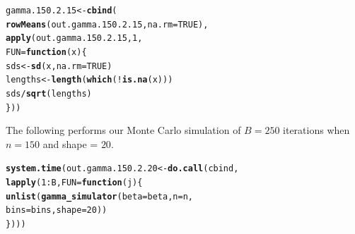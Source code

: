 \documentclass[11pt]{article}\usepackage[]{graphicx}\usepackage[]{color}
\makeatletter
\newcommand{\hlnum}[1]{\textcolor[rgb]{0.686,0.059,0.569}{#1}}%
\newcommand{\hlopt}[1]{\textcolor[rgb]{0,0,0}{#1}}%
\newcommand{\hlstd}[1]{\textcolor[rgb]{0.345,0.345,0.345}{#1}}%
\newcommand{\hlkwa}[1]{\textcolor[rgb]{0.161,0.373,0.58}{\textbf{#1}}}%
\newcommand{\hlkwb}[1]{\textcolor[rgb]{0.69,0.353,0.396}{#1}}%
\newcommand{\hlkwc}[1]{\textcolor[rgb]{0.333,0.667,0.333}{#1}}%
\newcommand{\hlkwd}[1]{\textcolor[rgb]{0.737,0.353,0.396}{\textbf{#1}}}%
\newenvironment{kframe}{%
 \def\at@end@of@kframe{}%
 \ifinner\ifhmode%
  \def\at@end@of@kframe{\end{minipage}}%
  \begin{minipage}{\columnwidth}%
 \fi\fi%
 \def\FrameCommand##1{\hskip\@totalleftmargin \hskip-\fboxsep
 \colorbox{shadecolor}{##1}\hskip-\fboxsep
     \hskip-\linewidth \hskip-\@totalleftmargin \hskip\columnwidth}%
 \MakeFramed {\advance\hsize-\width
   \@totalleftmargin\z@ \linewidth\hsize
   \@setminipage}}%
 {\par\unskip\endMakeFramed%
 \at@end@of@kframe}
\newenvironment{knitrout}{}{} %
\makeatother
\begin{document}
\begin{knitrout}
\color{fgcolor}\begin{kframe}
\begin{alltt}
\hlstd{gamma.150.2.15} \hlkwb{<-} \hlkwd{cbind}\hlstd{(}
  \hlkwd{rowMeans}\hlstd{(out.gamma.150.2.15,} \hlkwc{na.rm} \hlstd{=} \hlnum{TRUE}\hlstd{),}
  \hlkwd{apply}\hlstd{(out.gamma.150.2.15,} \hlnum{1}\hlstd{,}
  \hlkwc{FUN} \hlstd{=} \hlkwa{function}\hlstd{(}\hlkwc{x}\hlstd{)\{}
    \hlstd{sds} \hlkwb{<-} \hlkwd{sd}\hlstd{(x,} \hlkwc{na.rm} \hlstd{=} \hlnum{TRUE}\hlstd{)}
    \hlstd{lengths} \hlkwb{<-} \hlkwd{length}\hlstd{(}\hlkwd{which}\hlstd{(}\hlopt{!}\hlkwd{is.na}\hlstd{(x)))}
    \hlstd{sds} \hlopt{/} \hlkwd{sqrt}\hlstd{(lengths)}
  \hlstd{\}))}
\end{alltt}


{\ttfamily\noindent\bfseries\color{errorcolor}{\#\# Error in is.data.frame(x): object 'out.gamma.150.2.15' not found}}\end{kframe}
\end{knitrout}

The following performs our Monte Carlo simulation of $B = 250$ iterations 
when $n = 150$ and shape = $20$.

\begin{knitrout}
\color{fgcolor}\begin{kframe}
\begin{alltt}
\hlkwd{system.time}\hlstd{(out.gamma.150.2.20} \hlkwb{<-} \hlkwd{do.call}\hlstd{(cbind,}
  \hlkwd{lapply}\hlstd{(}\hlnum{1}\hlopt{:}\hlstd{B,} \hlkwc{FUN} \hlstd{=} \hlkwa{function}\hlstd{(}\hlkwc{j}\hlstd{)\{}
    \hlkwd{unlist}\hlstd{(}\hlkwd{gamma_simulator}\hlstd{(}\hlkwc{beta} \hlstd{= beta,} \hlkwc{n} \hlstd{= n,}
      \hlkwc{bins} \hlstd{= bins,} \hlkwc{shape} \hlstd{=} \hlnum{20}\hlstd{))}
\hlstd{\})))}
\end{alltt}


{\ttfamily\noindent\bfseries\color{errorcolor}{\#\# Error in eval(predvars, data, env): object 'x1' not found}}

{\ttfamily\noindent\itshape\color{messagecolor}{\#\# Timing stopped at: 0.002 0 0.002}}\end{kframe}
\end{knitrout}
\end{document}
